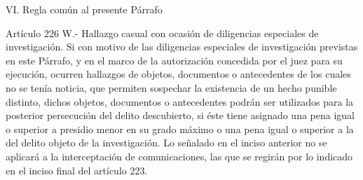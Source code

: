     VI. Regla común al presente Párrafo



    Artículo 226 W.- Hallazgo casual con ocasión de diligencias especiales de investigación. Si con motivo de las diligencias especiales de investigación previstas en este Párrafo, y en el marco de la autorización concedida por el juez para su ejecución, ocurren hallazgos de objetos, documentos o antecedentes de los cuales no se tenía noticia, que permiten sospechar la existencia de un hecho punible distinto, dichos objetos, documentos o antecedentes podrán ser utilizados para la posterior persecución del delito descubierto, si éste tiene asignado una pena igual o superior a presidio menor en su grado máximo o una pena igual o superior a la del delito objeto de la investigación.
    Lo señalado en el inciso anterior no se aplicará a la interceptación de comunicaciones, las que se regirán por lo indicado en el inciso final del artículo 223.

